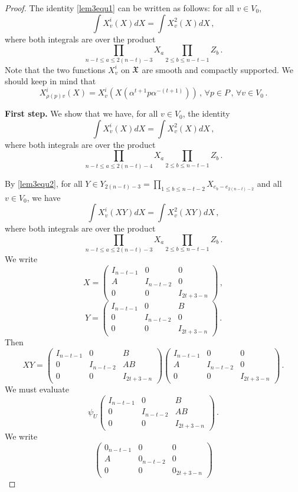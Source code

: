 \documentclass[12pt]{amsart}
\begin{document}
\begin{proof}
The identity \eqref{lem3equ1} can be written as follows: for all $v \in V_0$, 
\[\int X_v^i(X) d X = \int X_v^2 (X ) d X \,,\] 
where both integrals are over the product
$$\prod_{n-t \leq a \leq 2(n-t)-3} X_{a} \prod_{2 \leq b \leq n-t-1} Z_b\,.$$
Note that the two functions $X^i_v$ on $\frak{X}$ are smooth and compactly supported. We should keep in mind that
\[ X_{\rho(p)v}^i (X) = X_v^i( X (\alpha^{t+1} p {\alpha^{-(t+1)}} )) \,,\, \forall p \in P\,,\, \forall v \in V_0\,.\]

\textbf{First step.} We show that we have, for all $v \in V_0$, the identity
\[ \int X_v^i(X) d X = \int X_v^2 (X ) d X \, ,\]
where both integrals are over the product
$$\prod_{n-t \leq a \leq 2(n-t)-4} X_{a} \prod_{2 \leq b \leq n-t-1} Z_b\,.$$

By \eqref{lem3equ2}, for all $Y \in Y_{2(n-t)-3}=\prod _{1\leq b \leq n-t-2} X_{e_b -e _{2(n-t)-2}}$ and all $v \in V_0$, we have
 \[\int X_v^i(XY ) d X = \int X_v^2 (X Y ) d X \,,\] 
where both integrals are over the product
$$\prod_{n-t \leq a \leq 2(n-t)-3} X_{a} \prod_{2 \leq b \leq n-t-1} Z_b\,.$$  
We write
\[X = \left(\begin{array}{ccc} I_{n-t-1} & 0 & 0 \\ A & I_{ n-t-2}&0 \\ 0 &0 &I_{ 2t + 3 -n} \end{array}\right) \,,\]
\[ Y = \left(\begin{array}{ccc} I_{n-t-1} & 0 & B \\ 0 & I_{ n-t-2}&0 \\ 0 &0 &I_{ 2t + 3 -n} \end{array}\right) \,.\]
Then
\[ XY = \left(\begin{array}{ccc} I_{n-t-1} & 0 & B \\ 0 & I_{ n-t-2}& AB \\ 0 &0 &I_{ 2t + 3 -n} \end{array}\right)  \left(\begin{array}{ccc} I_{n-t-1} & 0 & 0 \\ A & I_{ n-t-2}&0 \\ 0 &0 &I_{ 2t + 3 -n} \end{array}\right) \,.\]
We must evaluate
\[ \psi_U \left(\begin{array}{ccc} I_{n-t-1} & 0 & B \\ 0 & I_{ n-t-2}& AB \\ 0 &0 &I_{ 2t + 3 -n} \end{array}\right) \,.\]
We write
\[\left(\begin{array}{ccc} 0_{n-t-1} & 0 & 0 \\ A & 0_{ n-t-2}&0 \\ 0 &0 &0_{ 2t + 3 -n} \end{array}\right)
\]
\end{proof}
\end{document}
